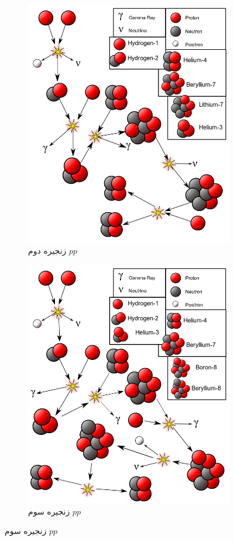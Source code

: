 \documentclass[a4paper,11pt,oneside,openany]{iut-thesis}
\begin{document}
\begin{figure}
\begin{subfigure}[b]{.33\linewidth}
		\includegraphics[width=\linewidth]{pp2}
		\caption{
	زنجیره دوم $pp$	
	}
	\end{subfigure}
	\begin{subfigure}[b]{.33\linewidth}
		\includegraphics[width=\linewidth]{pp3}
		\caption{
	زنجیره سوم $pp$	
	}
	\end{subfigure}


\end{figure}
\end{document}
